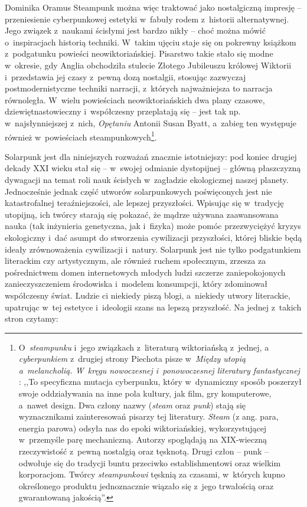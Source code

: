 \begin{artplenv}{Dominika Oramus}
Steampunk można więc traktować jako nostalgiczną impresję -- przeniesienie cyberpunkowej estetyki w~fabuły rodem z~historii alternatywnej. Jego związek z~naukami ścisłymi jest bardzo nikły -- choć można mówić o~inspiracjach historią techniki. W~takim ujęciu staje się on pokrewny książkom z~podgatunku powieści neowiktoriańskiej. Pisarstwo takie stało się modne w~okresie, gdy Anglia obchodziła stulecie Złotego Jubileuszu królowej Wiktorii i~przedstawia jej czasy z~pewną dozą nostalgii, stosując zazwyczaj postmodernistyczne techniki narracji, z~których najważniejsza to narracja równoległa. W~wielu powieściach neowiktoriańskich dwa plany czasowe, dziewiętnastowieczny i~współczesny przeplatają się -- jest tak np. w~najsłynniejszej z~nich, \textit{Opętaniu} Antonii Susan Byatt, a~zabieg ten występuje również w~powieściach steampunkowych\footnote{O~\textit{steampunku} i~jego związkach z~literaturą wiktoriańską z~jednej, a \textit{cyberpunkiem} z~drugiej strony Piechota pisze w~\textit{Między utopią a~melancholią. W~kręgu nowoczesnej i~ponowoczesnej literatury fantastycznej}
\parencite*[][s.~87–90]{piechota_miedzy_2015}: %
 ,,To specyficzna mutacja cyberpunku, który w~dynamiczny sposób poszerzył swoje oddziaływania na inne pola kultury, jak film, gry komputerowe, a~nawet design. Dwa człony nazwy (\textit{steam} oraz \textit{punk}) stają się wyznacznikami zainteresowań pisarzy tej literatury. \textit{Steam} (z ang. para, energia parowa) odsyła nas do epoki wiktoriańskiej, wykorzystującej w~przemyśle parę mechaniczną. Autorzy spoglądają na XIX-wieczną rzeczywistość z~pewną nostalgią oraz tęsknotą. Drugi człon -- punk -- odwołuje się do tradycji buntu przeciwko establishmentowi oraz wielkim korporacjom. Twórcy \textit{steampunkowi} tęsknią za czasami, w~których kupno określonego produktu jednoznacznie wiązało się z~jego trwałością oraz gwarantowaną jakością''.}.

Solarpunk jest dla niniejszych rozważań znacznie istotniejszy: pod koniec drugiej dekady XXI wieku stał się -- w~swojej odmianie dystopijnej -- główną płaszczyzną dywagacji na temat roli nauk ścisłych w~zagładzie ekologicznej naszej planety. Jednocześnie jednak część utworów solarpunkowych poświęconych jest nie katastrofalnej teraźniejszości, ale lepszej przyszłości. Wpisując się w~tradycję utopijną, ich twórcy starają się pokazać, że mądrze używana zaawansowana nauka (tak inżynieria genetyczna, jak i~fizyka) może pomóc przezwyciężyć kryzys ekologiczny i~dać asumpt do stworzenia cywilizacji przyszłości, której bliskie będą ideały zrównoważenia cywilizacji i~natury. Solarpunk jest nie tylko podgatunkiem literackim czy artystycznym, ale również ruchem społecznym, zrzesza za pośrednictwem domen internetowych młodych ludzi szczerze zaniepokojonych zanieczyszczeniem środowiska i~modelem konsumpcji, który zdominował współczesny świat. Ludzie ci niekiedy piszą blogi, a~niekiedy utwory literackie, upatrując w~tej estetyce i~ideologii szans na lepszą przyszłość. Na jednej z~takich stron czytamy:


\end{artplenv}
